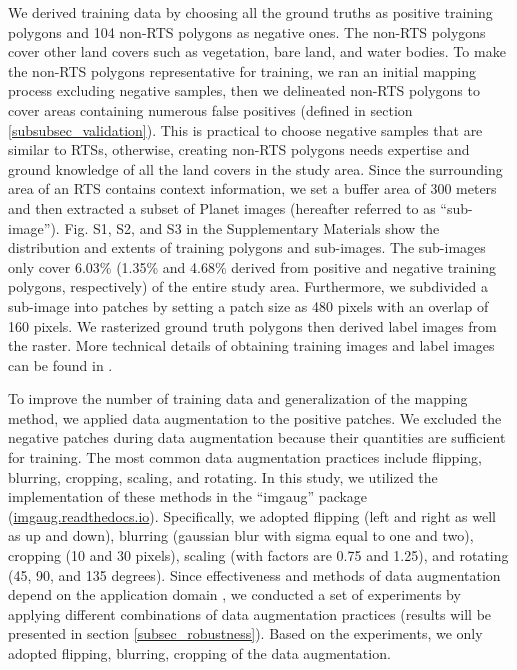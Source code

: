 \documentclass[preprint,12pt,authoryear]{elsarticle}
\begin{document}
We derived training data by choosing all the ground truths as positive training polygons and 104 non-RTS polygons as negative ones. The non-RTS polygons cover other land covers such as vegetation, bare land, and water bodies. To make the non-RTS polygons representative for training, we ran an initial mapping process excluding negative samples, then we delineated non-RTS polygons to cover areas containing numerous false positives (defined in section \ref{subsubsec_validation}). This is practical to choose negative samples that are similar to RTSs, otherwise, creating non-RTS polygons needs expertise and ground knowledge of all the land covers in the study area. Since the surrounding area of an RTS contains context information, we set a buffer area of 300 meters and then extracted a subset of Planet images (hereafter referred to as “sub-image”). Fig. S1, S2, and S3 in the Supplementary Materials show the distribution and extents of training polygons and sub-images. The sub-images only cover 6.03\% (1.35\% and 4.68\% derived from positive and negative training polygons, respectively) of the entire study area. Furthermore, we subdivided a sub-image into patches by setting a patch size as 480 pixels with an overlap of 160 pixels. We rasterized ground truth polygons then derived label images from the raster. More technical details of obtaining training images and label images can be found in \cite{huang2018automatic}. 

To improve the number of training data and generalization of the mapping method, we applied data augmentation to the positive patches. We excluded the negative patches during data augmentation because their quantities are sufficient for training. The most common data augmentation practices include flipping, blurring, cropping, scaling, and rotating. In this study, we utilized the implementation of these methods in the “imgaug” package (\url{imgaug.readthedocs.io}). Specifically, we adopted flipping (left and right as well as up and down), blurring (gaussian blur with sigma equal to one and two), cropping (10 and 30 pixels), scaling (with factors are 0.75 and 1.25), and rotating (45, 90, and 135 degrees). Since effectiveness and methods of data augmentation depend on the application domain \citep{perez2017effectiveness}, we conducted a set of experiments by applying different combinations of data augmentation practices (results will be presented in section \ref{subsec_robustness}). Based on the experiments, we only adopted flipping, blurring, cropping of the data augmentation. 
\end{document}
